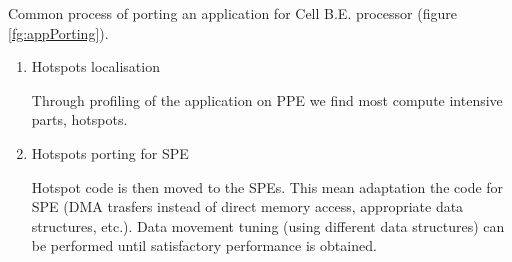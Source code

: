 Common process of porting an application for Cell B.E. processor (figure \ref{fg:appPorting}).
\begin{enumerate}
\item Hotspots localisation
\par
Through profiling of the application on PPE we find most compute intensive parts, hotspots.

\item Hotspots porting for SPE
\par
Hotspot code is then moved to the SPEs.
This mean adaptation the code for SPE (DMA trasfers instead of direct memory access, appropriate data structures, etc.).
Data movement tuning (using different data structures) can be performed until satisfactory performance is obtained.
\end{enumerate}

